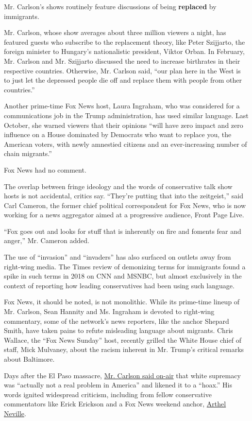 Mr. Carlson's shows routinely feature discussions of being
\textbf{replaced} by immigrants.

Mr. Carlson, whose show averages about three million viewers a night,
has featured guests who subscribe to the replacement theory, like Peter
Szijjarto, the foreign minister to Hungary's nationalistic president,
Viktor Orban. In February, Mr. Carlson and Mr. Szijjarto discussed the
need to increase birthrates in their respective countries. Otherwise,
Mr. Carlson said, ``our plan here in the West is to just let the
depressed people die off and replace them with people from other
countries.''

Another prime-time Fox News host, Laura Ingraham, who was considered for
a communications job in the Trump administration, has used similar
language. Last October, she warned viewers that their opinions ``will
have zero impact and zero influence on a House dominated by Democrats
who want to replace you, the American voters, with newly amnestied
citizens and an ever-increasing number of chain migrants.''

Fox News had no comment.

The overlap between fringe ideology and the words of conservative talk
show hosts is not accidental, critics say. ``They're putting that into
the zeitgeist,'' said Carl Cameron, the former chief political
correspondent for Fox News, who is now working for a news aggregator
aimed at a progressive audience, Front Page Live.

``Fox goes out and looks for stuff that is inherently on fire and
foments fear and anger,'' Mr. Cameron added.

The use of ``invasion'' and ``invaders'' has also surfaced on outlets
away from right-wing media. The Times review of demonizing terms for
immigrants found a spike in such terms in 2018 on CNN and MSNBC, but
almost exclusively in the context of reporting how leading conservatives
had been using such language.

Fox News, it should be noted, is not monolithic. While its prime-time
lineup of Mr. Carlson, Sean Hannity and Ms. Ingraham is devoted to
right-wing commentary, some of the network's news reporters, like the
anchor Shepard Smith, have taken pains to refute misleading language
about migrants. Chris Wallace, the ``Fox News Sunday'' host, recently
grilled the White House chief of staff, Mick Mulvaney, about the racism
inherent in Mr. Trump's critical remarks about Baltimore.

Days after the El Paso massacre,
\href{https://www.nytimes3xbfgragh.onion/2019/08/08/business/media/tucker-carlson-white-supremacy.html}{Mr.
Carlson said on-air} that white supremacy was ``actually not a real
problem in America'' and likened it to a ``hoax.'' His words ignited
widespread criticism, including from fellow conservative commentators
like Erick Erickson and a Fox News weekend anchor,
\href{https://twitter.com/ArthelNeville/status/1159470690132619265}{Arthel
Neville}.

